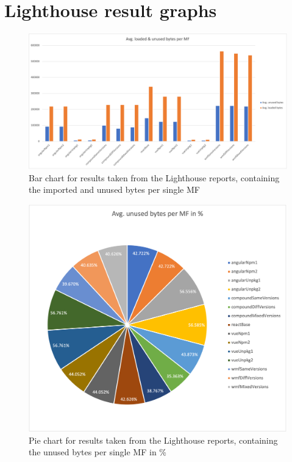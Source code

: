 
\chapter{Lighthouse result graphs} %

\label{appendix3} %


\begin{figure}[!h]
	\centering
	\begin{adjustbox}{width=\textwidth,totalheight=0.7\textheight}
		\includegraphics[angle=90]{Figures/avg_unsed_imported_mfe_1.png}
	\end{adjustbox}
	\caption{Bar chart for results taken from the Lighthouse reports, containing the imported and unused bytes per single MF}
	\label{fig:appendix_3_1}
\end{figure}
\newpage
\begin{figure}[!h]
	\centering
	\begin{adjustbox}{width=\textwidth,totalheight=\textheight}
		\includegraphics[angle=90]{Figures/avg_unsed_imported_mfe_2.png}
	\end{adjustbox}
	\caption{Pie chart for results taken from the Lighthouse reports, containing the unused bytes per single MF in \%}
	\label{fig:appendix_3_2}
\end{figure}
